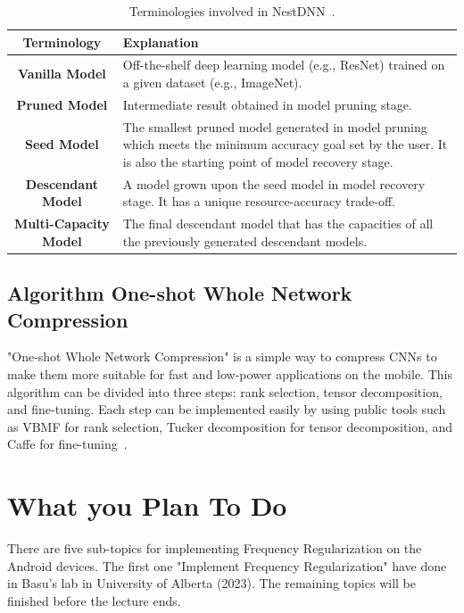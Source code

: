 \documentclass[UTF8]{article}
\begin{document}
\begin{table}
	\label{table_nestdnn}
	\centering
	\begin{tabular}{|c|>{\centering\arraybackslash}p{8cm}|}
		\hline
		\textbf{Terminology}&\textbf{Explanation}\\
		\hline
		\textbf{Vanilla Model}&Off-the-shelf deep learning model (e.g., ResNet) trained on a given dataset (e.g., ImageNet). \\
		\hline
		\textbf{Pruned Model}&Intermediate result obtained in model pruning stage.\\
		\hline
		\textbf{Seed Model}&The smallest pruned model generated in model pruning which meets the minimum accuracy goal set by the user. It is also the starting point of model recovery stage.\\
		\hline
		\textbf{Descendant Model}&A model grown upon the seed model in model recovery stage. It has a unique resource-accuracy trade-off.\\
		\hline
		\textbf{Multi-Capacity Model}&The final descendant model that has the capacities of
		all the previously generated descendant models.\\
		\hline
	\end{tabular}
	\caption{Terminologies involved in NestDNN~\cite{fang2018nestdnn}.}
\end{table}


\subsection{Algorithm One-shot Whole Network Compression}\label{oneshot}
"One-shot Whole Network Compression" is a simple way to compress CNNs to make them more suitable for fast and low-power applications on the mobile. This algorithm can be divided into three steps: rank selection, tensor decomposition, and fine-tuning. Each step can be implemented easily by using public tools such as VBMF for rank selection, Tucker decomposition for tensor decomposition, and Caffe for fine-tuning~\cite{kim2016compression}.

\section*{What you Plan To Do}
There are five sub-topics for implementing Frequency Regularization on the Android devices. The first one "Implement Frequency Regularization" have done in Basu's lab in University of Alberta (2023). The remaining topics will be finished before the lecture ends.
\end{document}

